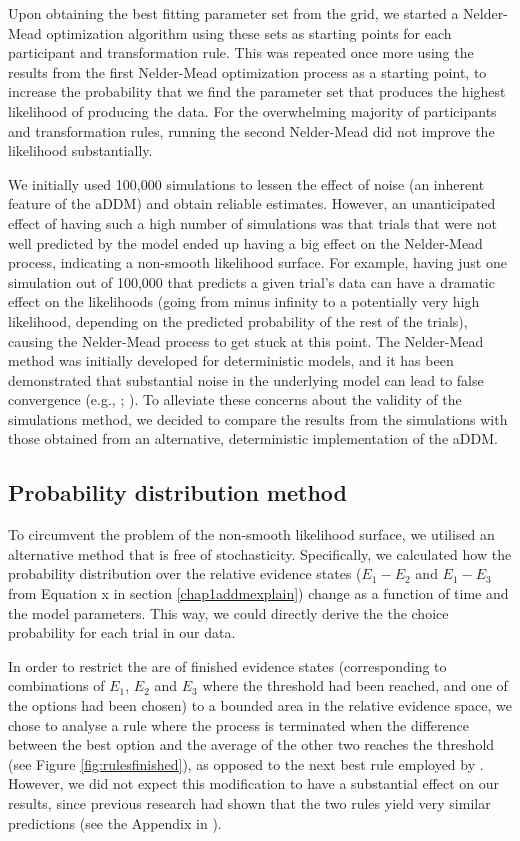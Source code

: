 \documentclass[11pt,a4paper]{article}
\begin{document}
Upon obtaining the best fitting parameter set from the grid, we started a Nelder-Mead optimization algorithm using these sets as starting points for each participant and transformation rule. This was repeated once more using the results from the first Nelder-Mead optimization process as a starting point, to increase the probability that we find the parameter set that produces the highest likelihood of producing the data. For the overwhelming majority of participants and transformation rules, running the second Nelder-Mead did not improve the likelihood substantially.

We initially used 100,000 simulations to lessen the effect of noise (an inherent feature of the aDDM) and obtain reliable estimates. However, an unanticipated effect of having such a high number of simulations was that trials that were not well predicted by the model ended up having a big effect on the Nelder-Mead process, indicating a non-smooth likelihood surface. For example, having just one simulation out of 100,000 that predicts a given trial's data can have a dramatic effect on the likelihoods (going from minus infinity to a potentially very high likelihood, depending on the predicted probability of the rest of the trials), causing the Nelder-Mead process to get stuck at this point. The Nelder-Mead method was initially developed for deterministic models, and it has been demonstrated that substantial noise in the underlying model can lead to false convergence (e.g., ; ). To alleviate these concerns about the validity of the simulations method, we decided to compare the results from the simulations with those obtained from an alternative, deterministic implementation of the aDDM.


\subsection{Probability distribution method}

To circumvent the problem of the non-smooth likelihood surface, we utilised an alternative method that is free of stochasticity. Specifically, we calculated how the probability distribution over the relative evidence states ($E_{1}-E_{2}$ and $E_{1}-E_{3}$ from Equation x in section \ref{chap1addmexplain}) change as a function of time and the model parameters. This way, we could directly derive the the choice probability for each trial in our data.

In order to restrict the are of finished evidence states (corresponding to combinations of $E_{1}$, $E_{2}$ and $E_{3}$ where the threshold had been reached, and one of the options had been chosen) to a bounded area in the relative evidence space, we chose to analyse a rule where the process is terminated when the difference between the best option and the average of the other two reaches the threshold (see Figure \ref{fig:rulesfinished}), as opposed to the next best rule employed by \citeauthor{Krajbich2011}. However, we did not expect this modification to have a substantial effect on our results, since previous research had shown that the two rules yield very similar predictions (see the Appendix in \citeauthor{Krajbich2011}).
\end{document}
